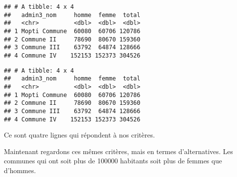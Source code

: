 \documentclass[]{book}
\newenvironment{Shaded}{\begin{snugshade}}{\end{snugshade}}
\newcommand{\KeywordTok}[1]{\textcolor[rgb]{0.13,0.29,0.53}{\textbf{#1}}}
\newcommand{\DataTypeTok}[1]{\textcolor[rgb]{0.13,0.29,0.53}{#1}}
\newcommand{\DecValTok}[1]{\textcolor[rgb]{0.00,0.00,0.81}{#1}}
\newcommand{\StringTok}[1]{\textcolor[rgb]{0.31,0.60,0.02}{#1}}
\newcommand{\CommentTok}[1]{\textcolor[rgb]{0.56,0.35,0.01}{\textit{#1}}}
\newcommand{\OperatorTok}[1]{\textcolor[rgb]{0.81,0.36,0.00}{\textbf{#1}}}
\newcommand{\NormalTok}[1]{#1}
\begin{document}
\begin{verbatim}
## # A tibble: 4 x 4
##   admin3_nom     homme  femme  total
##   <chr>          <dbl>  <dbl>  <dbl>
## 1 Mopti Commune  60080  60706 120786
## 2 Commune II     78690  80670 159360
## 3 Commune III    63792  64874 128666
## 4 Commune IV    152153 152373 304526
\end{verbatim}

\begin{Shaded}
\end{Shaded}

\begin{verbatim}
## # A tibble: 4 x 4
##   admin3_nom     homme  femme  total
##   <chr>          <dbl>  <dbl>  <dbl>
## 1 Mopti Commune  60080  60706 120786
## 2 Commune II     78690  80670 159360
## 3 Commune III    63792  64874 128666
## 4 Commune IV    152153 152373 304526
\end{verbatim}

Ce sont quatre lignes qui répondent à nos critères.

Maintenant regardons ces mêmes critères, mais en termes d'alternatives.
Les communes qui ont soit plus de 100000 habitants soit plus de femmes
que d'hommes.
\end{document}
